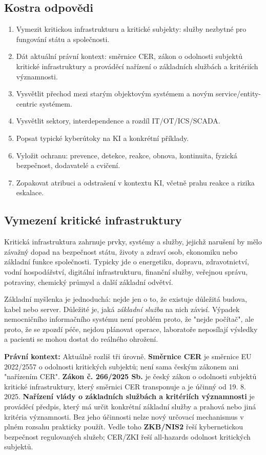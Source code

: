 \documentclass[11pt,a4paper]{article}
\newcommand{\pravobox}[1]{\begin{tcolorbox}[breakable,enhanced,colback=yellow!18,colframe=yellow!45!black,boxrule=0pt,arc=1mm,left=5pt,right=5pt,top=5pt,bottom=5pt,before skip=6pt,after skip=6pt]\textbf{Právní kontext:} #1\end{tcolorbox}}
\begin{document}
\subsection*{Kostra odpovědi}
\begin{enumerate}
  \item Vymezit kritickou infrastrukturu a kritické subjekty: služby nezbytné pro fungování státu a společnosti.
  \item Dát aktuální právní kontext: směrnice CER, zákon o odolnosti subjektů kritické infrastruktury a prováděcí nařízení o základních službách a kritériích významnosti.
  \item Vysvětlit přechod mezi starým objektovým systémem a novým service/entity-centric systémem.
  \item Vysvětlit sektory, interdependence a rozdíl IT/OT/ICS/SCADA.
  \item Popsat typické kyberútoky na KI a konkrétní příklady.
  \item Vyložit ochranu: prevence, detekce, reakce, obnova, kontinuita, fyzická bezpečnost, dodavatelé a cvičení.
  \item Zopakovat atribuci a odstrašení v kontextu KI, včetně prahu reakce a rizika eskalace.
\end{enumerate}

\subsection*{Vymezení kritické infrastruktury}
Kritická infrastruktura zahrnuje prvky, systémy a služby, jejichž narušení by mělo závažný dopad na bezpečnost státu, životy a zdraví osob, ekonomiku nebo základní funkce společnosti. Typicky jde o energetiku, dopravu, zdravotnictví, vodní hospodářství, digitální infrastrukturu, finanční služby, veřejnou správu, potraviny, chemický průmysl a další základní odvětví.

Základní myšlenka je jednoduchá: nejde jen o to, že existuje důležitá budova, kabel nebo server. Důležité je, jaká \emph{základní služba} na nich závisí. Výpadek nemocničního informačního systému není problém proto, že "nejde počítač", ale proto, že se zpozdí péče, nejdou plánovat operace, laboratoře neposílají výsledky a pacienti se mohou dostat do reálného ohrožení.

\pravobox{Aktuálně rozliš tři úrovně. \textbf{Směrnice CER} je směrnice EU 2022/2557 o odolnosti kritických subjektů; není sama českým zákonem ani "nařízením CER". \textbf{Zákon č. 266/2025 Sb.} je český zákon o odolnosti subjektů kritické infrastruktury, který směrnici CER transponuje a je účinný od 19. 8. 2025. \textbf{Nařízení vlády o základních službách a kritériích významnosti} je prováděcí předpis, který má určit konkrétní základní služby a prahová nebo jiná kritéria významnosti. Bez jeho účinnosti nelze nový určovací mechanismus v plném rozsahu prakticky použít. Vedle toho \textbf{ZKB/NIS2} řeší kybernetickou bezpečnost regulovaných služeb; CER/ZKI řeší all-hazards odolnost kritických subjektů.}
\end{document}
